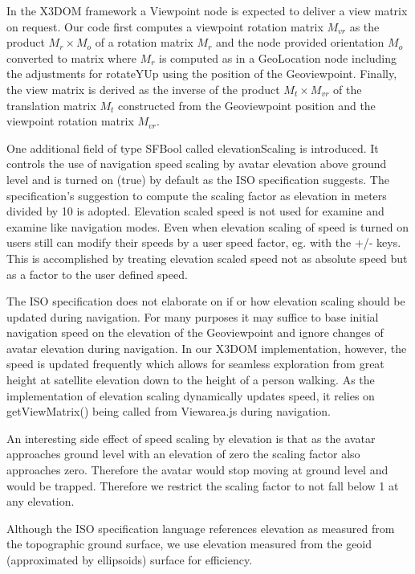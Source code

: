 \documentclass{acmsiggraph}                     %
\begin{document}
In the X3DOM framework a Viewpoint node is expected to deliver a view matrix on request. Our code first computes a viewpoint rotation matrix $M_{vr}$ as the product $M_r \times M_o$ of a rotation matrix $M_r$ and the node provided orientation $M_o$ converted to matrix where $M_r$ is computed as in a GeoLocation node including the adjustments for rotateYUp using the position of the Geoviewpoint. Finally, the view matrix is derived as the inverse of the product $M_t \times M_{vr}$ of the translation matrix $M_t$ constructed from the Geoviewpoint position and the viewpoint rotation matrix $M_{vr}$.

One additional field of type SFBool called elevationScaling is introduced. It controls the use of navigation speed scaling by avatar elevation above ground level and is turned on (true) by default as the ISO specification suggests. The specification's suggestion to compute the scaling factor as elevation in meters divided by 10 is adopted. Elevation scaled speed is not used for examine and examine like navigation modes. Even when elevation scaling of speed is turned on users still can modify their speeds by a user speed factor, eg. with the +/- keys. This is accomplished by treating elevation scaled speed not as absolute speed but as a factor to the user defined speed. 

The ISO specification does not elaborate on if or how elevation scaling should be updated during navigation. For many purposes it may suffice to base initial navigation speed on the elevation of the Geoviewpoint and ignore changes of avatar elevation during navigation. In our X3DOM implementation, however, the speed is updated frequently which allows for seamless exploration from great height at satellite elevation down to the height of a person walking. As the implementation of elevation scaling dynamically updates speed, it relies on getViewMatrix() being called from Viewarea.js during navigation.

An interesting side effect of speed scaling by elevation is that as the avatar approaches ground level with an elevation of zero the scaling factor also approaches zero. Therefore the avatar would stop moving at ground level and would be trapped. Therefore we restrict  the scaling factor to not fall below 1 at any elevation.

Although the ISO specification language references elevation as measured from the topographic ground surface, we use elevation measured from the geoid (approximated by ellipsoids) surface for efficiency.
\end{document}
